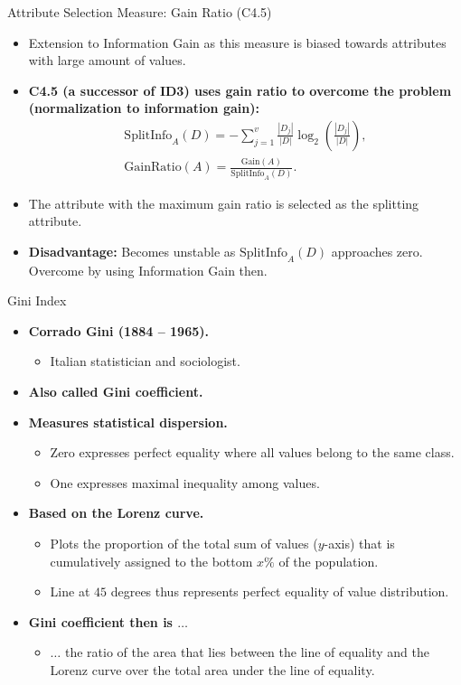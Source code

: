 \begin{frame}{Attribute Selection Measure: Gain Ratio (C4.5)}
	\begin{itemize}
		\item Extension to Information Gain as this measure is biased towards attributes with large amount of values.
		\item \textbf{C4.5 (a successor of ID3) uses gain ratio to overcome the problem (normalization to information gain):}
		      \begin{align*}
			      \text{SplitInfo}_A(D) = - \sum_{j=1}^{v} \frac{|D_j|}{|D|} \log_2\left( \frac{|D_j|}{|D|} \right), \\
			      \text{GainRatio}(A) = \frac{\text{Gain}(A)}{\text{SplitInfo}_A(D)}.
		      \end{align*}

		\item The attribute with the maximum gain ratio is selected as the splitting attribute.
		\item \textbf{Disadvantage:} Becomes unstable as $\text{SplitInfo}_A(D)$
		      approaches zero. Overcome by using Information Gain then.
	\end{itemize}
\end{frame}

\begin{frame}{Gini Index}
	\begin{itemize}
		\item \textbf{Corrado Gini (1884 -- 1965).}
		      \begin{itemize}
			      \item Italian statistician and sociologist.
		      \end{itemize}
		\item \textbf{Also called Gini coefficient.}
		\item \textbf{Measures statistical dispersion.}
		      \begin{itemize}
			      \item Zero expresses perfect equality where all values belong to the same class.
			      \item One expresses maximal inequality among values.
		      \end{itemize}
		\item \textbf{Based on the Lorenz curve.}
		      \begin{itemize}
			      \item Plots the proportion of the total sum of values ($y$-axis) that is cumulatively assigned to the bottom $x\%$ of the population.
			      \item Line at $45$ degrees thus represents perfect equality of value distribution.
		      \end{itemize}
		\item \textbf{Gini coefficient then is $\ldots$}
		      \begin{itemize}
			      \item $\ldots$ the ratio of the area that lies between the line of equality and the Lorenz curve over the total area under the line of equality.
		      \end{itemize}
	\end{itemize}
\end{frame}

